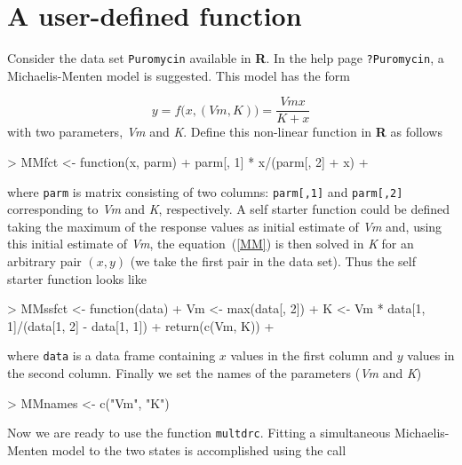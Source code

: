 \documentclass[a4paper]{article}
\begin{document}

\newpage
\section{A user-defined function} \label{sec:7}

Consider the data set \verb+Puromycin+ available in \textbf{R}. In the help page \verb+?Puromycin+, a Michaelis-Menten model is suggested. 
This model has the form

\begin{equation} \label{MM}
y = f \big( x, (Vm, K) \big) = \frac{Vm x}{K + x}
\end{equation}
with two parameters, \emph{Vm} and \emph{K}. Define this non-linear function in \textbf{R} as follows

\begin{Schunk}
\begin{Sinput}
> MMfct <- function(x, parm) {
+     parm[, 1] * x/(parm[, 2] + x)
+ }
\end{Sinput}
\end{Schunk}
where \verb+parm+ is matrix consisting of two columns: \verb+parm[,1]+ and \verb+parm[,2]+ corresponding to \emph{Vm} and \emph{K}, respectively. 
A self starter function could be defined taking the maximum of the response values as initial estimate of \emph{Vm} and, using this initial estimate of
\emph{Vm}, the equation~(\ref{MM}) is then solved in \emph{K} for an arbitrary pair $(x, y)$ (we take the first pair in the data set). Thus the self starter
function looks like

\begin{Schunk}
\begin{Sinput}
> MMssfct <- function(data) {
+     Vm <- max(data[, 2])
+     K <- Vm * data[1, 1]/(data[1, 2] - data[1, 1])
+     return(c(Vm, K))
+ }
\end{Sinput}
\end{Schunk}
where \verb+data+ is a data frame containing $x$ values in the first column and $y$ values in the second column. Finally we set the names of
the parameters (\emph{Vm} and \emph{K})

\begin{Schunk}
\begin{Sinput}
> MMnames <- c("Vm", "K")
\end{Sinput}
\end{Schunk}
Now we are ready to use the function \verb+multdrc+. Fitting a simultaneous Michaelis-Menten model to the two states is accomplished using the call
\end{document}
